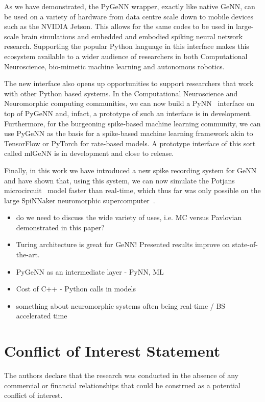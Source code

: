 \documentclass[utf8]{frontiersSCNS} %
\begin{document}
As we have demonstrated, the PyGeNN wrapper, exactly like native GeNN, can be used on a variety of hardware from data centre scale down to mobile devices such as the NVIDIA Jetson.
This allows for the same codes to be used in large-scale brain simulations and embedded and embodied spiking neural network research.
Supporting the popular Python language in this interface makes this ecosystem available to a wider audience of researchers in both Computational Neuroscience, bio-mimetic machine learning and autonomous robotics.

The new interface also opens up opportunities to support researchers that work with other Python based systems.
In the Computational Neuroscience and Neuromorphic computing communities, we can now build a PyNN~\citep{Davison2008} interface on top of PyGeNN and, infact, a prototype of such an interface is in development.
Furthermore, for the burgeoning spike-based machine learning community, we can use PyGeNN as the basis for a spike-based machine learning framework akin to TensorFlow or PyTorch for rate-based models.
A prototype interface of this sort called mlGeNN is in development and close to release.

Finally, in this work we have introduced a new spike recording system for GeNN and have shown that, using this system, we can now simulate the Potjans microcircuit~\citep{Potjans2012} model faster than real-time, which thus far was only possible on the large SpiNNaker neuromorphic supercomputer~\citep{Rhodes2019}.

\begin{itemize}
  \item do we need to discuss the wide variety of uses, i.e. MC versus Pavlovian demonstrated in this paper?
    \item Turing architecture is great for GeNN! Presented results improve on state-of-the-art.
    \item PyGeNN as an intermediate layer - PyNN, ML
    \item Cost of C++ - Python calls in models
    \item something about neuromorphic systems often being real-time / BS accelerated time
\end{itemize}

\section*{Conflict of Interest Statement}
The authors declare that the research was conducted in the absence of any commercial or financial relationships that could be construed as a potential conflict of interest.
\end{document}
